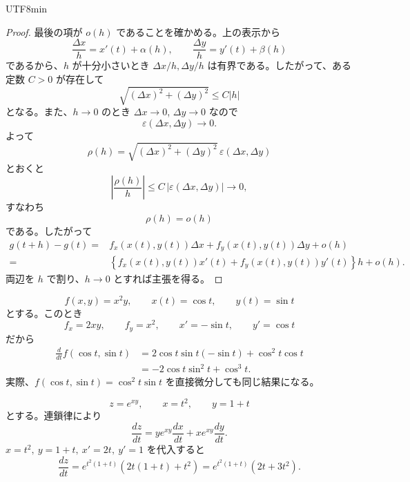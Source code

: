 \documentclass[a4paper,12pt]{article}
\begin{document}
\begin{CJK}{UTF8}{min}
\begin{proof}
最後の項が $o(h)$ であることを確かめる。上の表示から
\[
\frac{\Delta x}{h}=x'(t)+\alpha(h),\qquad
\frac{\Delta y}{h}=y'(t)+\beta(h)
\]
であるから、$h$ が十分小さいとき $\Delta x/h,\Delta y/h$ は有界である。したがって、ある定数 $C>0$ が存在して
\[
\sqrt{(\Delta x)^2+(\Delta y)^2}\le C|h|
\]
となる。また、$h\to0$ のとき $\Delta x\to0$, $\Delta y\to0$ なので
\[
\varepsilon(\Delta x,\Delta y)\to0.
\]
よって
\[
\rho(h)=\sqrt{(\Delta x)^2+(\Delta y)^2}\,\varepsilon(\Delta x,\Delta y)
\]
とおくと
\[
\left|\frac{\rho(h)}{h}\right|
\le C\,|\varepsilon(\Delta x,\Delta y)|\to0,
\]
すなわち
\[
\rho(h)=o(h)
\]
である。したがって
\[
\begin{aligned}
g(t+h)-g(t)
={}&f_x(x(t),y(t))\Delta x
+f_y(x(t),y(t))\Delta y+o(h)\\
={}&\left\{
f_x(x(t),y(t))x'(t)
+f_y(x(t),y(t))y'(t)
\right\}h+o(h).
\end{aligned}
\]
両辺を $h$ で割り、$h\to0$ とすれば主張を得る。
\end{proof}

\begin{example}
\[
f(x,y)=x^2y,\qquad x(t)=\cos t,\qquad y(t)=\sin t
\]
とする。このとき
\[
f_x=2xy,\qquad f_y=x^2,\qquad
x'=-\sin t,\qquad y'=\cos t
\]
だから
\[
\begin{aligned}
\frac{d}{dt}f(\cos t,\sin t)
&=2\cos t\sin t(-\sin t)+\cos^2t\cos t\\
&=-2\cos t\sin^2t+\cos^3t.
\end{aligned}
\]
実際、$f(\cos t,\sin t)=\cos^2t\sin t$ を直接微分しても同じ結果になる。
\end{example}

\begin{example}
\[
z=e^{xy},\qquad x=t^2,\qquad y=1+t
\]
とする。連鎖律により
\[
\frac{dz}{dt}
=ye^{xy}\frac{dx}{dt}+xe^{xy}\frac{dy}{dt}.
\]
$x=t^2,\ y=1+t,\ x'=2t,\ y'=1$ を代入すると
\[
\frac{dz}{dt}
=e^{t^2(1+t)}\left(2t(1+t)+t^2\right)
=e^{t^2(1+t)}(2t+3t^2).
\]
\end{example}


\ifPDFTeX
\end{CJK}
\fi
\end{document}
